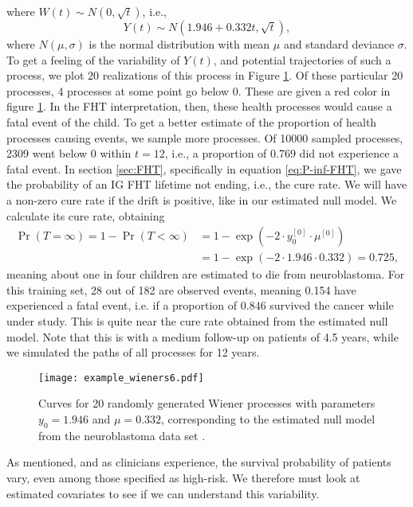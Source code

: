 where $W(t)\sim N(0,\sqrt{t})$,
i.e.,
\begin{equation*}
    Y(t)\sim N(1.946+0.332t,\sqrt{t}),
\end{equation*}
where $N(\mu,\sigma)$ is the normal distribution with mean $\mu$ and standard deviance $\sigma$.
To get a feeling of the variability of $Y(t)$, and potential trajectories of such a process, we plot 20 realizations of this process in Figure \ref{fig:neuroblastoma-wien}.
Of these particular 20 processes, 4 processes at some point go below 0.
These are given a red color in figure \ref{fig:neuroblastoma-wien}.
In the FHT interpretation, then, these health processes would cause a fatal event of the child.
To get a better estimate of the proportion of health processes causing events, we sample more processes.
Of 10000 sampled processes, 2309 went below 0 within $t=12$, i.e., a proportion of 0.769 did not experience a fatal event.
In section \ref{sec:FHT}, specifically in equation \eqref{eq:P-inf-FHT}, we gave the probability of an IG FHT lifetime not ending, i.e., the cure rate.
We will have a non-zero cure rate if the drift is positive, like in our estimated null model.
We calculate its cure rate, obtaining
\begin{align*}
    \Pr{(T=\infty)}=1-\Pr{(T<\infty)}&=1-\exp{(-2\cdot y_0^{[0]}\cdot\mu^{[0]})}\\
    &=1-\exp{(-2\cdot 1.946\cdot 0.332)}=0.725,
\end{align*}
meaning about one in four children are estimated to die from neuroblastoma.
For this training set, 28 out of 182 are observed events, meaning 0.154 have experienced a fatal event, i.e. if a proportion of 0.846 survived the cancer while under study.
This is quite near the cure rate obtained from the estimated null model.
Note that this is with a medium follow-up on patients of 4.5 years, while we simulated the paths of all processes for 12 years.
\begin{figure}
\caption{Curves for 20 randomly generated Wiener processes with parameters $y_0=1.946$ and $\mu=0.332$, corresponding to the estimated null model from the neuroblastoma data set \citep{oberthuer-data}.}
\label{fig:neuroblastoma-wien}
\centering
\texttt{[image: example\_wieners6.pdf]}
\end{figure}
As mentioned, and as clinicians experience, the survival probability of patients vary, even among those specified as high-risk.
We therefore must look at estimated covariates to see if we can understand this variability.

